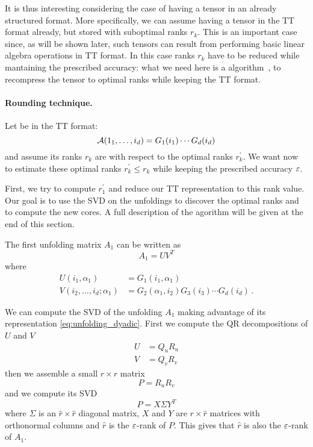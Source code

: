 It is thus interesting considering the case of having a tensor in an already structured format. More specifically, we can assume having a tensor in the TT format already, but stored with suboptimal ranks $r_k$. This is an important case since, as will be shown later, such tensors can result from performing basic linear algebra operations in TT format. In this case ranks $r_k$ have to be reduced while mantaining the prescribed accuracy: what we need here is a  algorithm~\cite{oseledets2011tt}, to recompress the tensor to optimal ranks while keeping the TT format.

\paragraph{Rounding technique.}
Let \A be in the TT format:
\begin{equation*}
  \mathcal{A}(1_1,\ldots,i_d) = G_1(i_1) \cdots G_d(i_d)
\end{equation*}
and assume its ranks $r_k$ are  with respect to the optimal ranks $r_k^\prime$. We want now to estimate these optimal ranks $r_k^\prime \le r_k$ while keeping the prescribed accuracy $\varepsilon$.

First, we try to compute $r_1^\prime$ and reduce our TT representation to this rank value. Our goal is to use the SVD on the unfoldings to discover the optimal ranks and to compute the new  cores. A full description of the agorithm will be given at the end of this section.%

The first unfolding matrix $A_1$ can be written as
\begin{equation} \label{eq:unfolding_dyadic}
  A_1 = UV^T
\end{equation}
where
\begin{equation} \label{def:UV}
  \begin{split}
    U(i_1,\alpha_1) &= G_1(i_1,\alpha_1)\\
    V(i_2,\ldots,i_d;\alpha_1) &= G_2(\alpha_1,i_2) G_3(i_3) \cdots G_d(i_d)\, .
  \end{split}
\end{equation}

We can compute the SVD of the unfolding $A_1$ making advantage of its representation \eqref{eq:unfolding_dyadic}. First we compute the QR decompositions of $U$ and $V$
\begin{equation*}
  \begin{split}
    U &= Q_u R_u\\
    V &= Q_v R_v
  \end{split}
\end{equation*}
then we assemble a small $r \times r$ matrix
\begin{equation*}
  P = R_u R_v
\end{equation*}
and we compute its SVD
\begin{equation*}
  P = X \Sigma Y^T
\end{equation*}
where $\Sigma$ is an $\hat{r}\times\hat{r}$ diagonal matrix, $X$ and $Y$ are $r \times \hat{r}$ matrices with orthonormal columns and $\hat{r}$ is the $\varepsilon$-rank of $P$. This gives that $\hat{r}$ is also the $\varepsilon$-rank of $A_1$.


